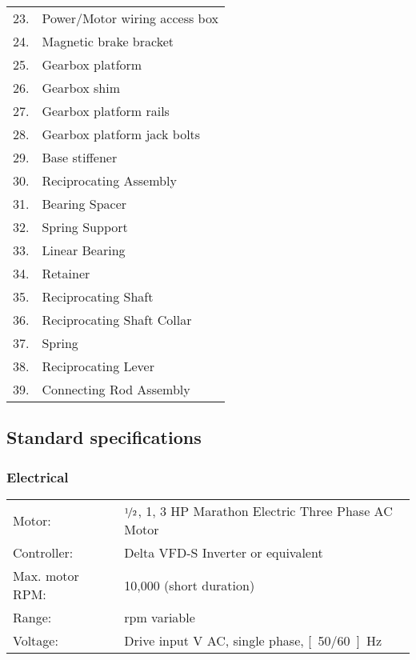 \documentclass[a4paper,11pt]{report}
\begin{document}
\begin{tabular}{rl}
23. & Power/Motor wiring access box\\
24. & Magnetic brake bracket\\
25. & Gearbox platform\\
26. & Gearbox shim\\
27. & Gearbox platform rails\\
28. & Gearbox platform jack bolts\\
29. & Base stiffener\\
30. & Reciprocating Assembly\\
31. & Bearing Spacer \\
32. & Spring Support \\
33. & Linear Bearing\\
34. & Retainer\\
35. & Reciprocating Shaft\\
36. & Reciprocating Shaft Collar \\
37. & Spring\\
38. & Reciprocating Lever\\
39. & Connecting Rod Assembly
\end{tabular}

\subsection{Standard specifications}
\subsubsection{Electrical}
\begin{tabular}{ll}
Motor: &  $\nicefrac{1}{2}$, 1, 3 HP Marathon Electric Three Phase AC Motor\\
Controller:& Delta VFD-S Inverter or equivalent\\
Max. motor RPM:& 10,000 (short duration)\\
Range:& \unit[0 to 10,000]{rpm} variable\\
Voltage:& Drive input \unit[120 or 230]{V} AC, single phase, \unit[50/60]{Hz}\\
\end{tabular}
\end{document}
